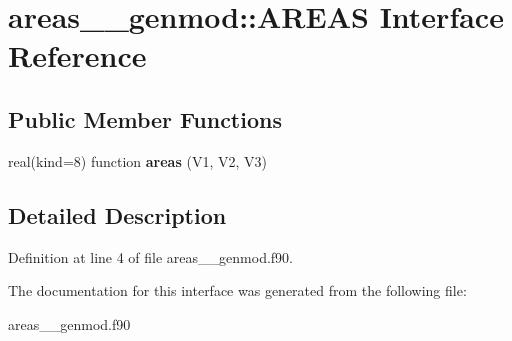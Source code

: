 \hypertarget{interfaceareas____genmod_1_1_a_r_e_a_s}{\section{areas\+\_\+\+\_\+genmod\+:\+:A\+R\+E\+A\+S Interface Reference}
\label{interfaceareas____genmod_1_1_a_r_e_a_s}
}
\subsection*{Public Member Functions}
\begin{DoxyCompactItemize}
\item 
\hypertarget{interfaceareas____genmod_1_1_a_r_e_a_s_a0032d50a24a69526dcf0d442d45bdb72}{real(kind=8) function {\bfseries areas} (V1, V2, V3)}\label{interfaceareas____genmod_1_1_a_r_e_a_s_a0032d50a24a69526dcf0d442d45bdb72}

\end{DoxyCompactItemize}


\subsection{Detailed Description}


Definition at line 4 of file areas\+\_\+\+\_\+genmod.\+f90.



The documentation for this interface was generated from the following file\+:\begin{DoxyCompactItemize}
\item 
areas\+\_\+\+\_\+genmod.\+f90\end{DoxyCompactItemize}
